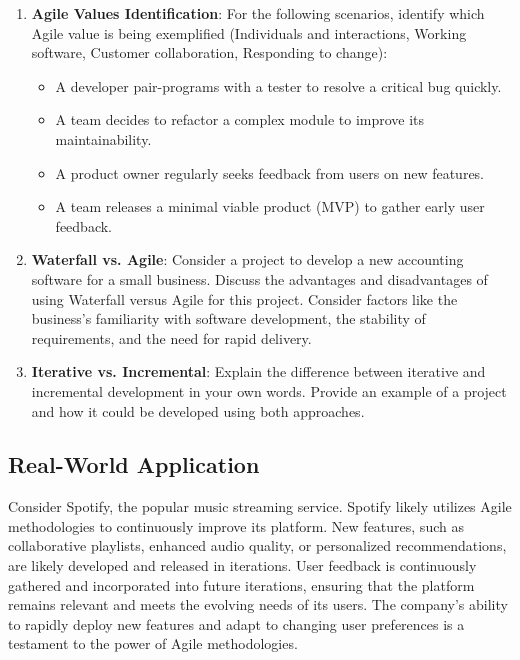 \begin{enumerate}
  \item \textbf{Agile Values Identification}: For the following scenarios, identify which Agile value is being exemplified (Individuals and interactions, Working software, Customer collaboration, Responding to change):
        \begin{itemize}
          \item A developer pair-programs with a tester to resolve a critical bug quickly.
          \item A team decides to refactor a complex module to improve its maintainability.
          \item A product owner regularly seeks feedback from users on new features.
          \item A team releases a minimal viable product (MVP) to gather early user feedback.
        \end{itemize}

  \item \textbf{Waterfall vs. Agile}: Consider a project to develop a new accounting software for a small business. Discuss the advantages and disadvantages of using Waterfall versus Agile for this project. Consider factors like the business's familiarity with software development, the stability of requirements, and the need for rapid delivery.

  \item \textbf{Iterative vs. Incremental}: Explain the difference between iterative and incremental development in your own words. Provide an example of a project and how it could be developed using both approaches.
\end{enumerate}

\subsection{Real-World Application}

Consider Spotify, the popular music streaming service. Spotify likely utilizes
Agile methodologies to continuously improve its platform. New features, such as
collaborative playlists, enhanced audio quality, or personalized
recommendations, are likely developed and released in iterations. User feedback
is continuously gathered and incorporated into future iterations, ensuring that
the platform remains relevant and meets the evolving needs of its users. The
company's ability to rapidly deploy new features and adapt to changing user
preferences is a testament to the power of Agile methodologies.

